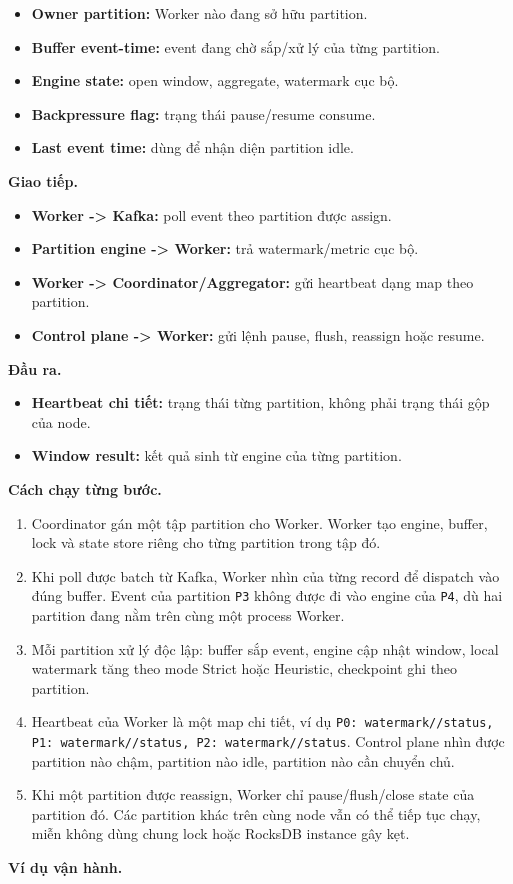 \documentclass[12pt,a4paper]{article}
\begin{document}
\begin{itemize}
\item \textbf{Owner partition:} Worker nào đang sở hữu partition.
\item \textbf{Buffer event-time:} event đang chờ sắp/xử lý của từng partition.
\item \textbf{Engine state:} open window, aggregate, watermark cục bộ.
\item \textbf{Backpressure flag:} trạng thái pause/resume consume.
\item \textbf{Last event time:} dùng để nhận diện partition idle.
\end{itemize}
\textbf{Giao tiếp.}

\begin{itemize}
\item \textbf{Worker -> Kafka:} poll event theo partition được assign.
\item \textbf{Partition engine -> Worker:} trả watermark/metric cục bộ.
\item \textbf{Worker -> Coordinator/Aggregator:} gửi heartbeat dạng map theo partition.
\item \textbf{Control plane -> Worker:} gửi lệnh pause, flush, reassign hoặc resume.
\end{itemize}
\textbf{Đầu ra.}

\begin{itemize}
\item \textbf{Heartbeat chi tiết:} trạng thái từng partition, không phải trạng thái gộp của node.
\item \textbf{Window result:} kết quả sinh từ engine của từng partition.
\end{itemize}
\textbf{Cách chạy từng bước.}

\begin{enumerate}
\item Coordinator gán một tập partition cho Worker. Worker tạo engine, buffer, lock và state store riêng cho từng partition trong tập đó.
\item Khi poll được batch từ Kafka, Worker nhìn  của từng record để dispatch vào đúng buffer. Event của partition \texttt{P3} không được đi vào engine của \texttt{P4}, dù hai partition đang nằm trên cùng một process Worker.
\item Mỗi partition xử lý độc lập: buffer sắp event, engine cập nhật window, local watermark tăng theo mode Strict hoặc Heuristic, checkpoint ghi theo partition.
\item Heartbeat của Worker là một map chi tiết, ví dụ \texttt{{P0: watermark//status, P1: watermark//status, P2: watermark//status}}. Control plane nhìn được partition nào chậm, partition nào idle, partition nào cần chuyển chủ.
\item Khi một partition được reassign, Worker chỉ pause/flush/close state của partition đó. Các partition khác trên cùng node vẫn có thể tiếp tục chạy, miễn không dùng chung lock hoặc RocksDB instance gây kẹt.
\end{enumerate}
\textbf{Ví dụ vận hành.}
\end{document}
